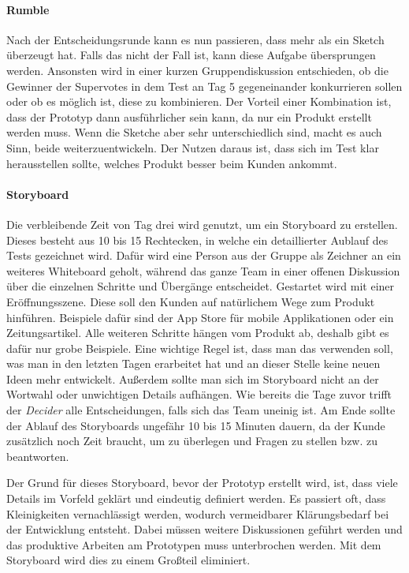 \paragraph{Rumble}
\label{sec:Sprint-Tag3-Rumble}
Nach der Entscheidungsrunde kann es nun passieren, dass mehr als ein Sketch überzeugt hat. Falls das nicht der Fall ist, kann diese Aufgabe übersprungen werden. Ansonsten wird in einer kurzen Gruppendiskussion entschieden, ob die Gewinner der Supervotes in dem Test an Tag 5 gegeneinander konkurrieren sollen oder ob es möglich ist, diese zu kombinieren. Der Vorteil einer Kombination ist, dass der Prototyp dann ausführlicher sein kann, da nur ein Produkt erstellt werden muss. Wenn die Sketche aber sehr unterschiedlich sind, macht es auch Sinn, beide weiterzuentwickeln. Der Nutzen daraus ist, dass sich im Test klar herausstellen sollte, welches Produkt besser beim Kunden ankommt. 

\paragraph{Storyboard}
\label{sec:Sprint-Tag3-Storyboard}
Die verbleibende Zeit von Tag drei wird genutzt, um ein Storyboard zu erstellen. Dieses besteht aus 10 bis 15 Rechtecken, in welche ein detaillierter Aublauf des Tests gezeichnet wird. Dafür wird eine Person aus der Gruppe als Zeichner an ein weiteres Whiteboard geholt, während das ganze Team in einer offenen Diskussion über die einzelnen Schritte und Übergänge entscheidet. Gestartet wird mit einer Eröffnungsszene. Diese soll den Kunden auf natürlichem Wege zum Produkt hinführen. Beispiele dafür sind der App Store für mobile Applikationen oder ein Zeitungsartikel. Alle weiteren Schritte hängen vom Produkt ab, deshalb gibt es dafür nur grobe Beispiele. Eine wichtige Regel ist, dass man das verwenden soll, was man in den letzten Tagen erarbeitet hat und an dieser Stelle keine neuen Ideen mehr entwickelt. Außerdem sollte man sich im Storyboard nicht an der Wortwahl oder unwichtigen Details aufhängen. Wie bereits die Tage zuvor trifft der \textit{Decider} alle Entscheidungen, falls sich das Team uneinig ist. Am Ende sollte der Ablauf des Storyboards ungefähr 10 bis 15 Minuten dauern, da der Kunde zusätzlich noch Zeit braucht, um zu überlegen und Fragen zu stellen bzw. zu beantworten.

Der Grund für dieses Storyboard, bevor der Prototyp erstellt wird, ist, dass viele Details im Vorfeld geklärt und eindeutig definiert werden. Es passiert oft, dass Kleinigkeiten vernachlässigt werden, wodurch vermeidbarer Klärungsbedarf bei der Entwicklung entsteht. Dabei müssen weitere Diskussionen geführt werden und das produktive Arbeiten am Prototypen muss unterbrochen werden. Mit dem Storyboard wird dies zu einem Großteil eliminiert.

